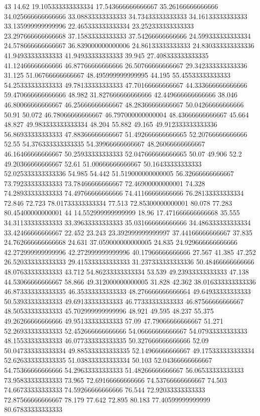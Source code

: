 43 14.62 19.105333333333334 17.543666666666667 35.26166666666666 34.025666666666666 33.08833333333333 34.73433333333333 34.16133333333333 33.135999999999996 22.465333333333334 23.252333333333333 23.297666666666668 37.15833333333333 37.54266666666666 24.599333333333334 24.578666666666667 36.839000000000006 24.86133333333333 24.830333333333336 41.94933333333333 41.94933333333333 39.945 27.408333333333335 41.12466666666666 46.87766666666666 26.50766666666667 29.342333333333336 31.125 51.06766666666667 48.495999999999995 44.195 55.45533333333333 54.25333333333333 49.78133333333333 47.70166666666667 44.333666666666666 59.470666666666666 48.982 31.827666666666666 42.449666666666666 38.046 46.80066666666667 46.25666666666667 48.28366666666667 50.04266666666666 50.91 50.072 46.78066666666667 46.797000000000004 48.43666666666667 45.664 48.827 49.983333333333334 48.204 55.882 49.165 49.912333333333336 56.86933333333333 47.88366666666667 51.492666666666665 52.20766666666666 52.55 54.376333333333335 54.39966666666667 48.26066666666667 46.16466666666667 50.25933333333333 52.047666666666665 50.07 49.906 52.2 49.20366666666667 52.61 51.00666666666667 50.16433333333333 52.025333333333336 54.985 54.442 51.519000000000005 56.32666666666667 73.79233333333333 73.78466666666667 72.46900000000001 74.328 74.28933333333333 74.49766666666666 74.41166666666666 76.28133333333334 72.846 72.723 78.01733333333334 77.513 72.85300000000001 80.078 77.283 80.45400000000001
44 14.552999999999999 18.96 17.471666666666668 35.555 34.31133333333333 33.39633333333333 35.031666666666666 34.486333333333334 33.42466666666667 22.452 23.243 23.392999999999997 37.44166666666667 37.835 24.762666666666668 24.631 37.059000000000005 24.835 24.929666666666666 42.272999999999996 42.272999999999996 40.17966666666666 27.567 41.385 47.252 26.520333333333333 29.415333333333333 31.237333333333336 50.48466666666666 48.07633333333333 43.712 54.86233333333334 53.539 49.23933333333333 47.138 44.53066666666667 58.866 49.312000000000005 31.828 42.362 38.016333333333336 46.873333333333335 46.35333333333333 48.276666666666664 49.64933333333333 50.53933333333333 49.69133333333333 46.77333333333333 46.87566666666667 48.50533333333333 45.702999999999996 48.921 49.595 48.237 55.375 49.26266666666666 49.95133333333333 57.09 47.79066666666667 51.271 52.26933333333333 52.452666666666666 54.06666666666667 54.07933333333333 48.15533333333333 46.077333333333335 50.327666666666666 52.09 50.047333333333334 49.885333333333335 52.14966666666667 49.175333333333334 52.626333333333335 51.038333333333334 50.103 52.04366666666667 54.75366666666666 54.29633333333333 51.48266666666667 56.06533333333333 73.95833333333333 73.965 72.69166666666666 74.53766666666667 74.503 74.66733333333333 74.59266666666666 76.544 72.92033333333333 72.87566666666667 78.179 77.642 72.895 80.183 77.40599999999999 80.67833333333333
